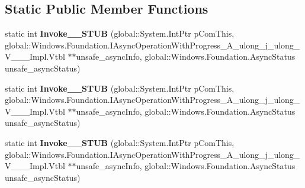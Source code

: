 \subsection*{Static Public Member Functions}
\begin{DoxyCompactItemize}
\item 
\mbox{\label{struct_windows_1_1_foundation_1_1_async_operation_with_progress_completed_handler___a__ulong__j__ulong___v_______impl_1_1_vtbl_ac570a6512f00d2c9c00d1ee1411213ba}} 
static int {\bfseries Invoke\+\_\+\+\_\+\+S\+T\+UB} (global\+::\+System.\+Int\+Ptr p\+Com\+This, global\+::\+Windows.\+Foundation.\+I\+Async\+Operation\+With\+Progress\+\_\+\+A\+\_\+ulong\+\_\+j\+\_\+ulong\+\_\+\+V\+\_\+\+\_\+\+\_\+\+Impl.\+Vtbl $\ast$$\ast$unsafe\+\_\+async\+Info, global\+::\+Windows.\+Foundation.\+Async\+Status unsafe\+\_\+async\+Status)
\item 
\mbox{\label{struct_windows_1_1_foundation_1_1_async_operation_with_progress_completed_handler___a__ulong__j__ulong___v_______impl_1_1_vtbl_ac570a6512f00d2c9c00d1ee1411213ba}} 
static int {\bfseries Invoke\+\_\+\+\_\+\+S\+T\+UB} (global\+::\+System.\+Int\+Ptr p\+Com\+This, global\+::\+Windows.\+Foundation.\+I\+Async\+Operation\+With\+Progress\+\_\+\+A\+\_\+ulong\+\_\+j\+\_\+ulong\+\_\+\+V\+\_\+\+\_\+\+\_\+\+Impl.\+Vtbl $\ast$$\ast$unsafe\+\_\+async\+Info, global\+::\+Windows.\+Foundation.\+Async\+Status unsafe\+\_\+async\+Status)
\item 
\mbox{\label{struct_windows_1_1_foundation_1_1_async_operation_with_progress_completed_handler___a__ulong__j__ulong___v_______impl_1_1_vtbl_ac570a6512f00d2c9c00d1ee1411213ba}} 
static int {\bfseries Invoke\+\_\+\+\_\+\+S\+T\+UB} (global\+::\+System.\+Int\+Ptr p\+Com\+This, global\+::\+Windows.\+Foundation.\+I\+Async\+Operation\+With\+Progress\+\_\+\+A\+\_\+ulong\+\_\+j\+\_\+ulong\+\_\+\+V\+\_\+\+\_\+\+\_\+\+Impl.\+Vtbl $\ast$$\ast$unsafe\+\_\+async\+Info, global\+::\+Windows.\+Foundation.\+Async\+Status unsafe\+\_\+async\+Status)
\item 
\mbox{\label{struct_windows_1_1_foundation_1_1_async_operation_with_progress_completed_handler___a__ulong__j__ulong___v_______impl_1_1_vtbl_ac570a6512f00d2c9c00d1ee1411213ba}} 
$$
\end{DoxyCompactItemize}
